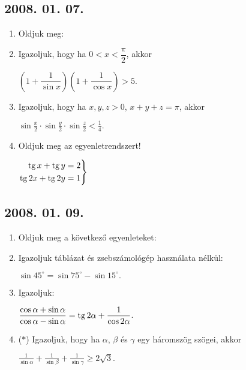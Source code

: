 \subsection*{2008. 01. 07.}
\begin{enumerate}
\item Oldjuk meg:
\item Igazoljuk, hogy ha $0<x<\dfrac{\pi}{2}$, akkor

$\left(1+\dfrac{1}{\sin x}\right)\left(1+\dfrac{1}{\cos x}\right)>5$.
\item Igazoljuk, hogy ha $x,y,z>0$, $x+y+z=\pi$, akkor

$\displaystyle\sin\frac{x}{2}\cdot\displaystyle\sin\frac{y}{2}\cdot\displaystyle\sin\frac{z}{2}\displaystyle<\frac{1}{4}.$

\item Oldjuk meg az egyenletrendszert!

$\left.
\begin{aligned}
\mathop{\mathrm{tg}}\nolimits x+\mathop{\mathrm{tg}}\nolimits y&=2\\
\mathop{\mathrm{tg}}\nolimits 2x+\mathop{\mathrm{tg}}\nolimits 2y&=1
\end{aligned}
\right\}$
\end{enumerate}

\subsection*{2008. 01. 09.}
\begin{enumerate}
\item Oldjuk meg a következő egyenleteket:
\item Igazoljuk táblázat és zsebszámológép használata nélkül:

$\sin45^\circ=\sin75^\circ-\sin15^\circ.$
\item Igazoljuk:

$\displaystyle\frac{\cos\alpha+\sin\alpha}{\cos\alpha-\sin\alpha}=\mathop{\mathrm{tg}}\nolimits2\alpha+\frac{1}{\cos2\alpha}$.

\item ($*$) Igazoljuk, hogy ha $\alpha$, $\beta$ és $\gamma$ egy háromszög szögei, akkor

$\displaystyle\frac{1}{\sin\alpha}+\frac{1}{\sin\beta}+\frac{1}{\sin\gamma}\geq2\sqrt{3}.$
 
\end{enumerate}

